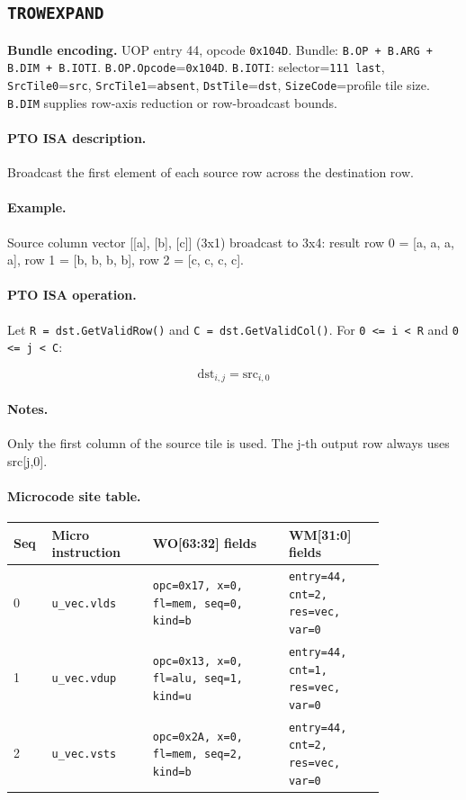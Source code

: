 \subsection{\texttt{TROWEXPAND}}
\noindent\textbf{Bundle encoding.} UOP entry 44, opcode \texttt{0x104D}. Bundle: \texttt{B.OP + B.ARG + B.DIM + B.IOTI}. \texttt{B.OP.Opcode}=\texttt{0x104D}. \texttt{B.IOTI}: selector=\texttt{111 last}, \texttt{SrcTile0}=\texttt{src}, \texttt{SrcTile1}=\texttt{absent}, \texttt{DstTile}=\texttt{dst}, \texttt{SizeCode}=profile tile size. \texttt{B.DIM} supplies row-axis reduction or row-broadcast bounds.\par\smallskip
{\small
\paragraph{PTO ISA description.}
Broadcast the first element of each source row across the destination row.
\paragraph{Example.}
Source column vector [[a], [b], [c]] (3x1) broadcast to 3x4: result row 0 = [a, a, a, a], row 1 = [b, b, b, b], row 2 = [c, c, c, c].
\par\smallskip
\paragraph{PTO ISA operation.}
Let \texttt{R = dst.GetValidRow()} and \texttt{C = dst.GetValidCol()}. For \texttt{0 \textless{}= i \textless{} R} and \texttt{0 \textless{}= j \textless{} C}:

\[
\mathrm{dst}_{i,j} = \mathrm{src}_{i,0}
\]
}\par\smallskip
\paragraph{Notes.}
Only the first column of the source tile is used. The j-th output row always uses src[j,0].
\paragraph{Microcode site table.}
{\scriptsize
\begin{longtable}{@{}R{0.055\linewidth}L{0.23\linewidth}L{0.31\linewidth}L{0.22\linewidth}@{}}
\toprule
Seq & Micro instruction & WO[63:32] fields & WM[31:0] fields \\
 & \texttt{u\_vec.vlds} & \texttt{opc=0x17, x=0, fl=mem, seq=0, kind=b} & \texttt{entry=44, cnt=2, res=vec, var=0} \\
1 & \texttt{u\_vec.vdup} & \texttt{opc=0x13, x=0, fl=alu, seq=1, kind=u} & \texttt{entry=44, cnt=1, res=vec, var=0} \\
2 & \texttt{u\_vec.vsts} & \texttt{opc=0x2A, x=0, fl=mem, seq=2, kind=b} & \texttt{entry=44, cnt=2, res=vec, var=0} \\
\bottomrule
\end{longtable}
}

